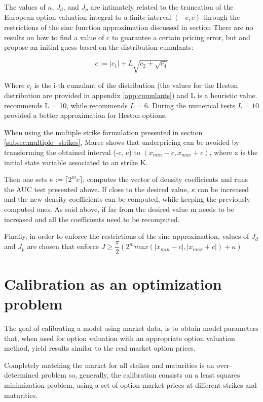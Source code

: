 \documentclass[12,twoside]{mammeTFM}
\theoremstyle{definition}
\theoremstyle{remark}
\begin{document}
The values of $\kappa$, $J_d$, and $J_p$ are intimately related to the truncation of the European option valuation integral to a finite interval $(-c, c)$ through the restrictions of the sinc function approximation discussed in section \. There are no results on how to find a value of c to guarantee a certain pricing error, but \cite{Ortiz-Gracia2016} and \cite{cui17} propose an initial guess based on the distribution cumulants:

\begin{equation}
c := |c_1| + L \sqrt{c_2 + \sqrt{c_4}}
\end{equation}

Where $c_i$ is the i-th cumulant of the distribution (the values for the Heston distribution are provided in appendix \ref{app:cumulants}) and L is a heuristic value. \cite{Ortiz-Gracia2016} recommends L = 10, while \cite{mar17} recommends $L = 6$. During the numerical tests $L = 10$ provided a better approximation for Heston options.

When using the multiple strike formulation presented in section \ref{subsec:multiple_strikes}, Maree shows that underpricing can be avoided by transforming the obtained interval (-c, c) to $(x_{min} - c, x_{max} + c)$, where x is the initial state variable associated to an strike K.

Then one sets $\kappa := \lceil 2^m c \rceil$, computes the vector of density coefficients and runs the AUC test presented above. If close to the desired value, $\kappa$ can be increased and the new density coefficients can be computed, while keeping the previously computed ones. As said above, if far from the desired value m needs to be increased and all the coefficients need to be recomputed.

Finally, in order to enforce the restrictions of the sinc approximation, values of $J_d$ and $J_p$ are chosen that enforce $J \geq \dfrac{\pi}{2}(2^m max(|x_{min} - c|, |x_{max} + c|) + \kappa)$

\section{Calibration as an optimization problem} \label{chap:optimization_problem}
The goal of calibrating a model using market data, is to obtain model parameters that, when used for option valuation with an appropriate option valuation method, yield results similar to the real market option prices.

Completely matching the market for all strikes and maturities is an over-determined problem so, generally, the calibration consists on a least squares minimization problem, using a set of option market prices at different strikes and maturities.
\end{document}
